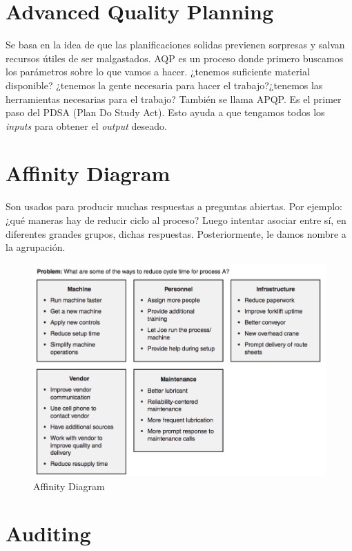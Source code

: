 \documentclass[oneside]{book}
\begin{document}
\section{Advanced Quality Planning} 

Se basa en la idea de que las planificaciones solidas previenen sorpresas y salvan recursos útiles de ser malgastados. AQP es un proceso donde primero buscamos los parámetros sobre lo que vamos a hacer. ¿tenemos suficiente material disponible? ¿tenemos la gente necesaria para hacer el trabajo?¿tenemos las herramientas necesarias para el trabajo? También se llama APQP. 
Es el primer paso del PDSA (Plan Do Study Act). Esto ayuda a que tengamos todos los \textit{inputs} para obtener el \textit{output} deseado. 

\section{Affinity Diagram}

Son usados para producir muchas respuestas a preguntas abiertas. Por ejemplo:¿qué maneras hay de reducir ciclo al proceso? Luego intentar asociar entre sí, en diferentes grandes grupos, dichas respuestas. Posteriormente, le damos nombre a la agrupación.

\begin{figure}[H]
	\centering
	\includegraphics[width=120mm]{imagenes/AffinityDiagram.png}
	\caption{Affinity Diagram}
	\label{fig:AffinityDiagram}
\end{figure}

\section{Auditing}
\end{document}
